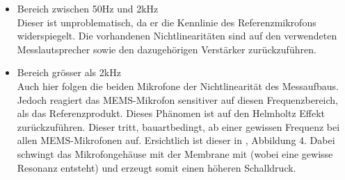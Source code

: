 \documentclass[12pt]{article}
\begin{document}
		\begin{itemize}
			\item Bereich zwischen 50Hz und 2kHz \\
			Dieser ist unproblematisch, da er die Kennlinie des Referenzmikrofons widerspiegelt. Die vorhandenen Nichtlinearitäten sind auf den verwendeten Messlautsprecher sowie den dazugehörigen Verstärker zurückzuführen.
			\item \color{orange} Bereich grösser als 2kHz \color{black} \\
			Auch hier folgen die beiden Mikrofone der Nichtlinearität des Messaufbaus. Jedoch reagiert das \color{blue}MEMS\color{black}-Mikrofon sensitiver auf diesen Frequenzbereich, als das Referenzprodukt. Dieses Phänomen ist auf den Helmholtz Effekt zurückzuführen. Dieser tritt, bauartbedingt, ab einer gewissen Frequenz bei allen MEMS-Mikrofonen auf. Ersichtlich ist dieser in \cite{noauthor_httpsinvensensetdkcomwp-contentuploads202007ds-000157-ics-41351-v14pdf_nodate}, Abbildung 4. Dabei schwingt das Mikrofongehäuse mit der Membrane mit (wobei eine gewisse Resonanz entsteht) und erzeugt somit einen höheren Schalldruck.
		\end{itemize}
		
\end{document}
